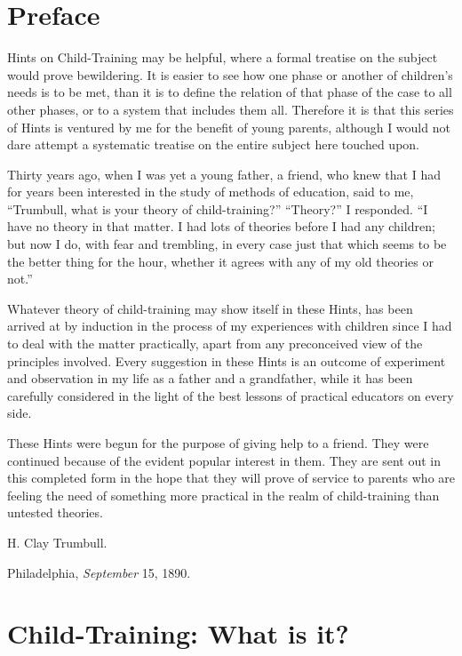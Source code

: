 \documentclass[
]{book}
\begin{document}
\clearpage
\setcounter{page}{1}

\hypertarget{preface}{%
\chapter*{Preface}\label{preface}}

Hints on Child-Training may be helpful, where a formal treatise on the subject would prove bewildering. It is easier to see how one phase or another of children's needs is to be met, than it is to define the relation of that phase of the case to all other phases, or to a system that includes them all. Therefore it is that this series of Hints is ventured by me for the benefit of young parents, although I would not dare attempt a systematic treatise on the entire subject here touched upon.

Thirty years ago, when I was yet a young father, a friend, who knew that I had for years been interested in the study of methods of education, said to me, ``Trumbull, what is your theory of child-training?'' ``Theory?'' I responded. ``I have no theory in that matter. I had lots of theories before I had any children; but now I do, with fear and trembling, in every case just that which seems to be the better thing for the hour, whether it agrees with any of my old theories or not.''

Whatever theory of child-training may show itself in these Hints, has been arrived at by induction in the process of my experiences with children since I had to deal with the matter practically, apart from any preconceived view of the principles involved. Every suggestion in these Hints is an outcome of experiment and observation in my life as a father and a grandfather, while it has been carefully considered in the light of the best lessons of practical educators on every side.

These Hints were begun for the purpose of giving help to a friend. They were continued because of the evident popular interest in them. They are sent out in this completed form in the hope that they will prove of service to parents who are feeling the need of something more practical in the realm of child-training than untested theories.

H. Clay Trumbull.

Philadelphia, \emph{September} 15, 1890.

\hypertarget{child-training-what-is-it}{%
\chapter{Child-Training: What is it?}\label{child-training-what-is-it}}
\end{document}
